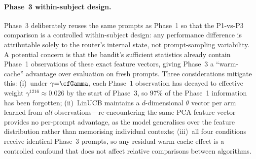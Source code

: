 \paragraph{Phase~3 within-subject design.}
Phase~3 deliberately reuses the same prompts as Phase~1 so that the
P1-vs-P3 comparison is a controlled within-subject design: any
performance difference is attributable solely to the router's internal
state, not prompt-sampling variability.
A potential concern is that the bandit's sufficient statistics already
contain Phase~1 observations of these exact feature vectors, giving
Phase~3 a ``warm-cache'' advantage over evaluation on fresh prompts.
Three considerations mitigate this:
(i)~under $\gamma{=}\cfGamma$, each Phase~1 observation has decayed to
effective weight $\gamma^{1216} \approx 0.026$ by the start of Phase~3,
so 97\% of the Phase~1 information has been forgotten;
(ii)~LinUCB maintains a $d$-dimensional $\theta$ vector per arm learned
from \emph{all} observations---re-encountering the same PCA feature
vector provides no per-prompt advantage, as the model generalises over
the feature distribution rather than memorising individual contexts;
(iii)~all four conditions receive identical Phase~3 prompts, so any
residual warm-cache effect is a controlled confound that does not affect
relative comparisons between algorithms.
